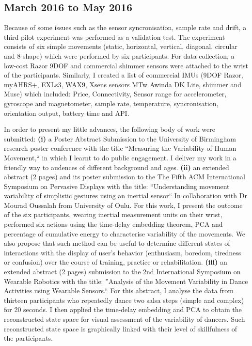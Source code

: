 \documentclass[9pt,journal,onecolumn,compsoc]{IEEEtran}
\begin{document}
\subsection{March 2016 to May 2016}

Because of some issues such as the sensor syncronisation, sample rate and drift, a third pilot experiment was performed
as a validation test.
The experiment consists of six simple movements 
(static, horizontal, vertical, diagonal, circular and 8-shape)
which were performed by six participants. 
For data collection,
a low-cost Razor 9DOF
and commercial shimmer sensors were attached to the wrist of the participants.
Similarly, I created a list of commercial IMUs
(9DOF Razor, myAHRS+, EXLs3, WAX9, Xsens sensors MTw Awinda DK Lite, shimmer and Muse)
which included:
Price, Connectivity, Sensor range for accelerometer, gyroscope and magnetometer, 
sample rate, temperature, syncronisation, orientation output, battery time and API.


In order to present my little advances, the following body of work
were submitted:
\textbf{(i)} a Poster Abstract Submission to the University of Birmingham research poster conference
with the title ``Measuring the Variability of Human Movement,``
in which I learnt to do public engagement. I deliver my work in a friendly way to audences of 
different background and ages.
\textbf{(ii)} an extended abstract (2 pages) and its poster submission to the The Fifth ACM International 
Symposium on Pervasive Displays with the title: 
``Understanding movement variability of simplistic gestures using an inertial sensor``
In collaboration with Dr Mourad Oussalah from University of Oulu. 
For this work, I present the outcome of the six participants, 
wearing inertial measurement units on their wrist, performed six actions
using the time-delay embedding theorem, PCA and percentage of cumulative energy 
to characterise variability of the movements. 
We also propose that such method can be useful
to determine different states of interactions with the display of user’s behavior 
(enthusiasm, boredom, tiredness or confusion) over the course of training, practice or rehabilitation.
\textbf{(iii)} an extended abstract (2 pages) submission to the 2nd International Symposium on Wearable Robotics
with the title: ''Analysis of the Movement Variability in Dance Activities using Wearable Sensors.`` 
For this abstract,
I analyse the data from thirteen participants who repeatedly dance two salsa steps (simple and complex) for 20 seconds. 
I then applied the time-delay embedding and PCA to obtain the reconstructed state space
for visual assessment of the variability of dancers. 
Such reconstructed state space is graphically linked with their level of skillfulness of the participants. 
\end{document}
